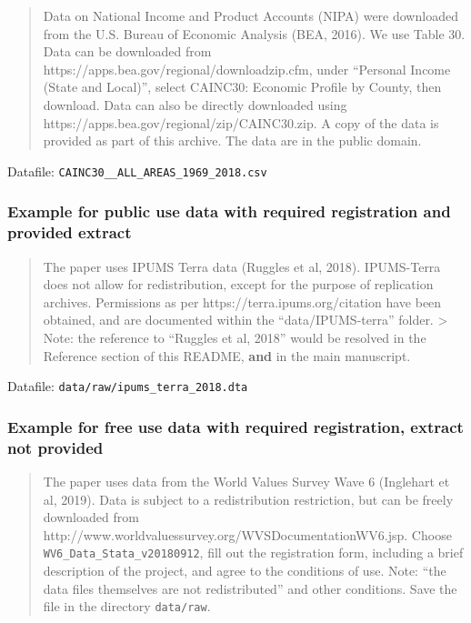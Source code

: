 \documentclass[
]{article}
\begin{document}
\begin{quote}
Data on National Income and Product Accounts (NIPA) were downloaded from
the U.S. Bureau of Economic Analysis (BEA, 2016). We use Table 30. Data
can be downloaded from https://apps.bea.gov/regional/downloadzip.cfm,
under ``Personal Income (State and Local)'', select CAINC30: Economic
Profile by County, then download. Data can also be directly downloaded
using https://apps.bea.gov/regional/zip/CAINC30.zip. A copy of the data
is provided as part of this archive. The data are in the public domain.
\end{quote}

Datafile: \texttt{CAINC30\_\_ALL\_AREAS\_1969\_2018.csv}

\hypertarget{example-for-public-use-data-with-required-registration-and-provided-extract}{%
\subsubsection{Example for public use data with required registration
and provided
extract}\label{example-for-public-use-data-with-required-registration-and-provided-extract}}

\begin{quote}
The paper uses IPUMS Terra data (Ruggles et al, 2018). IPUMS-Terra does
not allow for redistribution, except for the purpose of replication
archives. Permissions as per https://terra.ipums.org/citation have been
obtained, and are documented within the ``data/IPUMS-terra'' folder.
\textgreater{} Note: the reference to ``Ruggles et al, 2018'' would be
resolved in the Reference section of this README, \textbf{and} in the
main manuscript.
\end{quote}

Datafile: \texttt{data/raw/ipums\_terra\_2018.dta}

\hypertarget{example-for-free-use-data-with-required-registration-extract-not-provided}{%
\subsubsection{Example for free use data with required registration,
extract not
provided}\label{example-for-free-use-data-with-required-registration-extract-not-provided}}

\begin{quote}
The paper uses data from the World Values Survey Wave 6 (Inglehart et
al, 2019). Data is subject to a redistribution restriction, but can be
freely downloaded from
http://www.worldvaluessurvey.org/WVSDocumentationWV6.jsp. Choose
\texttt{WV6\_Data\_Stata\_v20180912}, fill out the registration form,
including a brief description of the project, and agree to the
conditions of use. Note: ``the data files themselves are not
redistributed'' and other conditions. Save the file in the directory
\texttt{data/raw}.
\end{quote}
\end{document}
